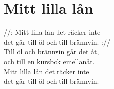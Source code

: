 \section{Mitt lilla lån}
//: Mitt lilla lån det räcker inte\\
det går till öl och till brännvin. ://\\
Till öl och brännvin går det åt,\\
och till en kursbok emellanåt.\\
Mitt lilla lån det räcker inte\\
det går till öl och till brännvin.\\
